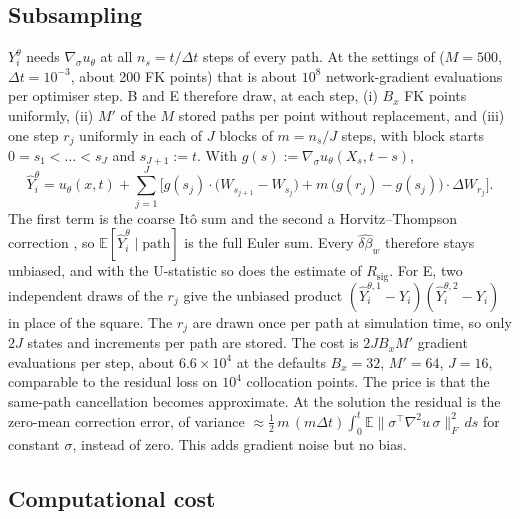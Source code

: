 \documentclass[english]{article}
\begin{document}
\subsection{Subsampling}
 $Y^\theta_i$ needs $\nabla_\sigma u_\theta$ at all $n_s = t/\Delta t$ steps of every path. At the settings of \cite{tepakbong2026taming} ($M=500$, $\Delta t=10^{-3}$, about 200 FK points) that is about $10^8$ network-gradient evaluations per optimiser step. B and E therefore draw, at each step, (i) $B_x$ FK points uniformly, (ii) $M'$ of the $M$ stored paths per point without replacement, and (iii) one step $r_j$ uniformly in each of $J$ blocks of $m = n_s/J$ steps, with block starts $0 = s_1 < \dots < s_J$ and $s_{J+1} := t$. With $g(s) := \nabla_\sigma u_\theta(X_s, t-s)$,
\begin{equation}\label{eq:subsample}
  \hat Y^\theta_i = u_\theta(x,t) + \sum_{j=1}^J\Big[g(s_j)\cdot\big(W_{s_{j+1}} - W_{s_j}\big) + m\,\big(g(r_j) - g(s_j)\big)\cdot\Delta W_{r_j}\Big].
\end{equation}
The first term is the coarse It\^o sum and the second a Horvitz--Thompson correction \cite{horvitz1952generalization}, so $\mathbb E[\hat Y^\theta_i\mid\text{path}]$ is the full Euler sum. Every $\widehat{\delta\beta}_w$ therefore stays unbiased, and with the U-statistic so does the estimate of $R_\mathrm{sig}$. For E, two independent draws of the $r_j$ give the unbiased product $(\hat Y^{\theta,1}_i - Y_i)(\hat Y^{\theta,2}_i - Y_i)$ in place of the square. The $r_j$ are drawn once per path at simulation time, so only $2J$ states and increments per path are stored. The cost is $2JB_xM'$ gradient evaluations per step, about $6.6\times10^4$ at the defaults $B_x=32$, $M'=64$, $J=16$, comparable to the residual loss on $10^4$ collocation points. The price is that the same-path cancellation becomes approximate. At the solution the residual is the zero-mean correction error, of variance $\approx\frac12\,m\,(m\Delta t)\int_0^t\mathbb E\|\sigma^\top\nabla^2u\,\sigma\|_F^2\,ds$ for constant $\sigma$, instead of zero. This adds gradient noise but no bias.
\newpage
\subsection{Computational cost}
\end{document}

